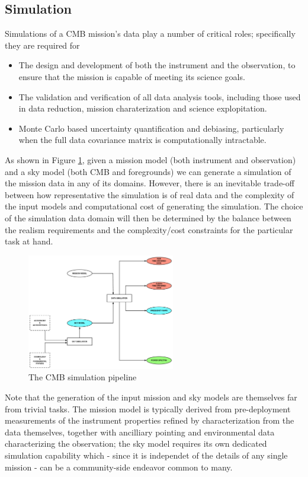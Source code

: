 \subsection{Simulation}

Simulations of a CMB mission's data play a number of critical roles; specifically they are required for
\begin{itemize}
\item The design and development of both the instrument and the observation, to ensure that the mission is capable of meeting its science goals.
\item The validation and verification of all data analysis tools, including those used in data reduction, mission charaterization and science explopitation.
\item Monte Carlo based uncertainty quantification and debiasing, particularly when the full data covariance matrix is computationally intractable.
\end{itemize}

As shown in Figure \ref{fig_sim}, given a mission model (both instrument and observation) and a sky model (both CMB and foregrounds) we can generate a simulation of the mission data in any of its domains. However, there is an inevitable trade-off between how representative the simulation is of real data and the complexity of the input models and computational cost of generating the simulation. The choice of the simulation data domain will then be determined by the balance between the realism requirements and the complexity/cost constraints for the particular task at hand.

\begin{figure}[htbp]
\centering
\includegraphics[width=0.575\textwidth]{Analysis/sim}
\caption{The CMB simulation pipeline}
\label{fig_sim}
\end{figure}

Note that the generation of the input mission and sky models are themselves far from trivial tasks. The mission model is typically derived from pre-deployment measurements of the instrument properties refined by characterization from the data themselves, together with ancilliary pointing and environmental data characterizing the observation; the sky model requires its own dedicated simulation capability which - since it is independet of the details of any single mission - can be a community-side endeavor common to many.

